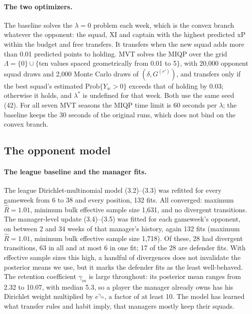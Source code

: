 \documentclass[12pt,oneside,a4paper]{book}
\theoremstyle{definition}
\theoremstyle{remark}
\begin{document}
	\paragraph{The two optimizers.} The baseline solves the $\lambda=0$ problem each week, which is
	the convex branch whatever the opponent: the squad, XI and captain with the highest predicted
	xP within the budget and free transfers. It transfers when the new squad adds more than 0.01
	predicted points to holding. MVT solves the MIQP over the grid $\Lambda=\{0\}\cup\{$ten values
	spaced geometrically from 0.01 to 5$\}$, with 20{,}000 opponent squad draws and 2{,}000 Monte
	Carlo draws of $(\delta,G^{(r')})$, and transfers only if the best squad's estimated
	$\mathrm{Prob}\{Y_w>0\}$ exceeds that of holding by 0.03; otherwise it holds, and $\lambda^*$
	is undefined for that week. Both use the same seed (42). For all seven MVT seasons the MIQP time
	limit is 60 seconds per $\lambda$; the baseline keeps the 30 seconds of the original runs, which
	does not bind on the convex branch.

	\subsection{The opponent model}
	\label{sec:s2-opponent}

	\paragraph{The league baseline and the manager fits.} The league Dirichlet-multinomial model
	(3.2)--(3.3) was refitted for every gameweek from 6 to 38 and every position, 132 fits. All
	converged: maximum $\hat R=1.01$, minimum bulk effective sample size 1{,}631, and no divergent
	transitions. The manager-level update (3.4)--(3.5) was fitted for each gameweek's opponent, on
	between 2 and 34 weeks of that manager's history, again 132 fits (maximum $\hat R=1.01$, minimum
	bulk effective sample size 1{,}718). Of these, 28 had divergent transitions, 63 in all and at
	most 6 in one fit; 17 of the 28 are defender fits. With effective sample sizes this high, a
	handful of divergences does not invalidate the posterior means we use, but it marks the
	defender fits as the least well-behaved.
	The retention coefficient $\gamma_m$ is large throughout: its posterior mean ranges from 2.32 to
	10.07, with median 5.3, so a player the manager already owns has his Dirichlet weight
	multiplied by $e^{\gamma_m}$, a factor of at least 10. The model has learned what transfer rules
	and habit imply, that managers mostly keep their squads.
\end{document}
